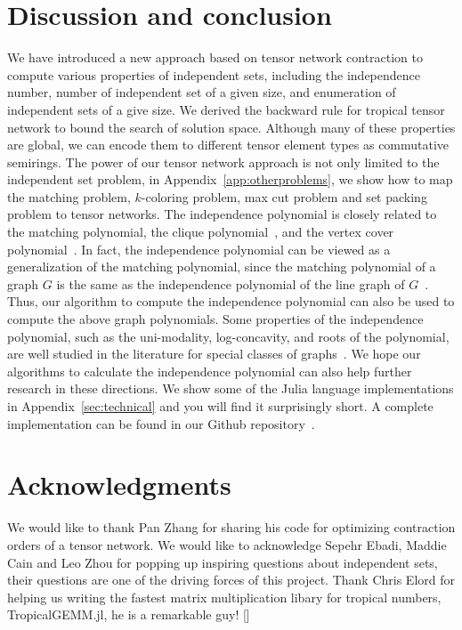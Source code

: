 \documentclass[onefignum, onetabnum]{siamart190516}
\newcommand{\<}{\langle}
\renewcommand{\>}{\rangle}
\newcommand{\App}[1]{Appendix~\ref{#1}}
\newcommand{\blue}[1]{[{\bf  \color{blue}{JG: #1}}]}
\begin{document}
\section{Discussion and conclusion}
We have introduced a new approach based on tensor network contraction to compute various properties of independent sets,
including the independence number, number of independent set of a given size, and enumeration of independent sets of a give size.
We derived the backward rule for tropical tensor network to bound the search of solution space.
Although many of these properties are global, we can encode them to different tensor element types as commutative semirings.
The power of our tensor network approach is not only limited to the independent set problem, in \App{app:otherproblems}, we show how to map the matching problem, $k$-coloring problem, max cut problem and set packing problem to tensor networks.
The independence polynomial is closely related to the matching polynomial, the clique polynomial~\cite{Hoede1994}, and the vertex cover polynomial~\cite{Akbari2013}.
In fact, the independence polynomial can be viewed as a generalization of the matching polynomial, since the matching polynomial of a graph $G$ is the same as the independence polynomial of the line graph of $G$~\cite{Levit2005}.
Thus, our algorithm to compute the independence polynomial can also be used to compute the above graph polynomials. Some properties of the independence polynomial, such as the uni-modality, log-concavity, and roots of the polynomial, are well studied in the literature for special classes of graphs~\cite{Levit2005}.
We hope our algorithms to calculate the independence polynomial can also help further research in these directions.
We show some of the Julia language implementations in Appendix~\ref{sec:technical} and you will find it surprisingly short.
A complete implementation can be found in our Github repository~\cite{GraphTensorNetworks}.

\section*{Acknowledgments}
We would like to thank Pan Zhang for sharing his code for optimizing contraction orders of a tensor network.
We would like to acknowledge Sepehr Ebadi, Maddie Cain and Leo Zhou for popping up inspiring questions about independent sets,
their questions are one of the driving forces of this project.
Thank Chris Elord for helping us writing the fastest matrix multiplication libary for tropical numbers, TropicalGEMM.jl, he is a remarkable guy!
\blue{funding information}
\end{document}
